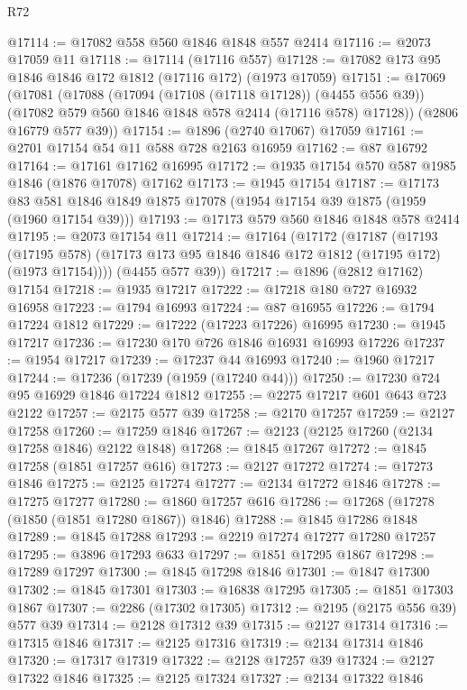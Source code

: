 \begin{lexlean}{R72}
\begin{coremodule}
@17114 := @17082 @558 @560 @1846 @1848 @557 @2414
@17116 := @2073 @17059 @11
@17118 := @17114 (@17116 @557)
@17128 := @17082 @173 @95 @1846 @1846 @172 @1812 (@17116 @172) (@1973 @17059)
@17151 := @17069
    (@17081
      (@17088
        (@17094 (@17108 (@17118 @17128)) (@4455 @556 @39))
        (@17082 @579 @560 @1846 @1848 @578 @2414 (@17116 @578) @17128))
      (@2806 @16779 @577 @39))
@17154 := @1896 (@2740 @17067) @17059
@17161 := @2701 @17154 @54 @11 @588 @728 @2163 @16959
@17162 := @87 @16792
@17164 := @17161 @17162 @16995
@17172 := @1935 @17154 @570 @587 @1985 @1846 (@1876 @17078) @17162
@17173 := @1945 @17154
@17187 := @17173
    @83
    @581
    @1846
    @1849
    @1875
    @17078
    (@1954 @17154 @39 @1875 (@1959 (@1960 @17154 @39)))
@17193 := @17173 @579 @560 @1846 @1848 @578 @2414
@17195 := @2073 @17154 @11
@17214 := @17164
    (@17172
      (@17187
        (@17193
          (@17195 @578)
          (@17173 @173 @95 @1846 @1846 @172 @1812 (@17195 @172) (@1973 @17154))))
      (@4455 @577 @39))
@17217 := @1896 (@2812 @17162) @17154
@17218 := @1935 @17217
@17222 := @17218 @180 @727 @16932 @16958
@17223 := @1794 @16993
@17224 := @87 @16955
@17226 := @1794 @17224 @1812
@17229 := @17222 (@17223 @17226) @16995
@17230 := @1945 @17217
@17236 := @17230 @170 @726 @1846 @16931 @16993 @17226
@17237 := @1954 @17217
@17239 := @17237 @44 @16993
@17240 := @1960 @17217
@17244 := @17236 (@17239 (@1959 (@17240 @44)))
@17250 := @17230 @724 @95 @16929 @1846 @17224 @1812
@17255 := @2275 @17217 @601 @643 @723 @2122
@17257 := @2175 @577 @39
@17258 := @2170 @17257
@17259 := @2127 @17258
@17260 := @17259 @1846
@17267 := @2123 (@2125 @17260 (@2134 @17258 @1846) @2122 @1848)
@17268 := @1845 @17267
@17272 := @1845 @17258 (@1851 @17257 @616)
@17273 := @2127 @17272
@17274 := @17273 @1846
@17275 := @2125 @17274
@17277 := @2134 @17272 @1846
@17278 := @17275 @17277
@17280 := @1860 @17257 @616
@17286 := @17268 (@17278 (@1850 (@1851 @17280 @1867)) @1846)
@17288 := @1845 @17286 @1848
@17289 := @1845 @17288
@17293 := @2219 @17274 @17277 @17280 @17257
@17295 := @3896 @17293 @633
@17297 := @1851 @17295 @1867
@17298 := @17289 @17297
@17300 := @1845 @17298 @1846
@17301 := @1847 @17300
@17302 := @1845 @17301
@17303 := @16838 @17295
@17305 := @1851 @17303 @1867
@17307 := @2286 (@17302 @17305)
@17312 := @2195 (@2175 @556 @39) @577 @39
@17314 := @2128 @17312 @39
@17315 := @2127 @17314
@17316 := @17315 @1846
@17317 := @2125 @17316
@17319 := @2134 @17314 @1846
@17320 := @17317 @17319
@17322 := @2128 @17257 @39
@17324 := @2127 @17322 @1846
@17325 := @2125 @17324
@17327 := @2134 @17322 @1846

\end{coremodule}
\end{lexlean}
